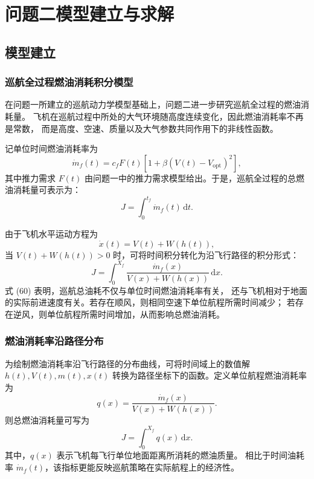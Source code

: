 \documentclass[UTF8]{ctexart}
\begin{document}
\section{问题二模型建立与求解}
\subsection{模型建立}
\subsubsection{巡航全过程燃油消耗积分模型}

在问题一所建立的巡航动力学模型基础上，问题二进一步研究巡航全过程的燃油消耗量。
飞机在巡航过程中所处的大气环境随高度连续变化，因此燃油消耗率不再是常数，
而是高度、空速、质量以及大气参数共同作用下的非线性函数。

记单位时间燃油消耗率为
\begin{equation}
    \dot m_f(t)
    =
    c_fF(t)
    \left[
    1+\beta\left(V(t)-V_{\mathrm{opt}}\right)^2
    \right],
    \label{eq:q2_fuel_rate}
\end{equation}
其中推力需求 $F(t)$ 由问题一中的推力需求模型给出。于是，巡航全过程的总燃油消耗量可表示为：
\begin{equation}
    J
    =
    \int_{0}^{t_f}\dot m_f(t)\,\mathrm{d}t.
    \label{eq:q2_total_fuel_time}
\end{equation}

由于飞机水平运动方程为
\begin{equation}
    \dot x(t)=V(t)+W(h(t)),
    \label{eq:q2_xdot}
\end{equation}
当 $V(t)+W(h(t))>0$ 时，可将时间积分转化为沿飞行路径的积分形式：
\begin{equation}
    J
    =
    \int_{0}^{X_f}
    \frac{\dot m_f(x)}{V(x)+W(h(x))}\,\mathrm{d}x.
    \label{eq:q2_total_fuel_path}
\end{equation}
式 (60) 表明，巡航总油耗不仅与单位时间燃油消耗率有关，
还与飞机相对于地面的实际前进速度有关。若存在顺风，则相同空速下单位航程所需时间减少；
若存在逆风，则单位航程所需时间增加，从而影响总燃油消耗。
\subsubsection{燃油消耗率沿路径分布}

为绘制燃油消耗率沿飞行路径的分布曲线，可将时间域上的数值解
$h(t),V(t),m(t),x(t)$ 转换为路径坐标下的函数。定义单位航程燃油消耗率为
\begin{equation}
    q(x)
    =
    \frac{\dot m_f(x)}{V(x)+W(h(x))}.
    \label{eq:q2_fuel_per_distance}
\end{equation}
则总燃油消耗量可写为
\begin{equation}
    J=\int_{0}^{X_f}q(x)\,\mathrm{d}x.
    \label{eq:q2_total_q}
\end{equation}
其中，$q(x)$ 表示飞机每飞行单位地面距离所消耗的燃油质量。
相比于时间油耗率 $\dot m_f(t)$，该指标更能反映巡航策略在实际航程上的经济性。
\end{document}
